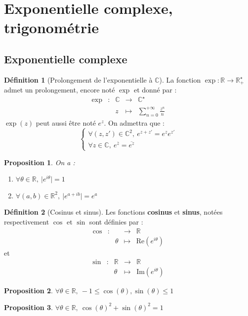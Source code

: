 \documentclass[french]{book}
\newcommand{\R}{\mathbb{R}}
\newcommand{\C}{\mathbb{C}}
\newcommand{\st}{^\star}
\theoremstyle{plain}
\newtheorem{prop}{Proposition}[chapter]
\theoremstyle{definition}
\newtheorem{dfn}{Définition}[chapter]
\theoremstyle{remark}
\begin{document}
\section{Exponentielle complexe, trigonométrie}
\subsection{Exponentielle complexe}
\begin{dfn}[Prolongement de l'exponentielle à $\C$]
	La fonction $\exp:\R\rightarrow\R_+\st$ admet un prolongement, encore noté $\exp$ et donné par : $$\begin{array}{ccccc}\exp&:&\C&\rightarrow&\C\st \\&&z&\mapsto&\displaystyle \sum_{n=0}^{+\infty}\frac{z^n}{n}\end{array}$$ $\exp(z)$ peut aussi être noté $e^z$. On admettra que : $$\begin{cases}
		\forall(z,z')\in\C^2,\ e^{z+z'}=e^ze^{z'}\\
		\forall z\in\C,\ e^{\overline{z}}=\overline{e^z}
	\end{cases}$$
\end{dfn}
\begin{prop}
	On a : \begin{enumerate}
		\item $\forall\theta\in\R,\ \lvert e^{i\theta}\rvert=1$
		\item $\forall(a,b)\in\R^2,\ \lvert e^{a+ib}\rvert=e^a$
	\end{enumerate}
\end{prop}
\begin{dfn}[Cosinus et sinus]
	Les fonctions \textbf{cosinus} et \textbf{sinus}, notées respectivement $\cos$ et $\sin$ sont définies par : $$\begin{array}{ccccc}\cos&:&\:&\rightarrow&\R\\&&\theta&\mapsto&\text{Re}(e^{i\theta})\end{array}$$ et
	$$\begin{array}{ccccc}\sin&:&\R&\rightarrow&\R\\&&\theta&\mapsto&\text{Im}(e^{i\theta})\end{array}$$
\end{dfn}
\begin{prop}
	$\forall\theta\in\R,\ -1\leqslant \cos(\theta),\sin(\theta)\leqslant 1$
\end{prop}
\begin{prop}
	$\forall\theta\in\R,\ \cos(\theta)^2+\sin(\theta)^2=1$
\end{prop}
\end{document}
